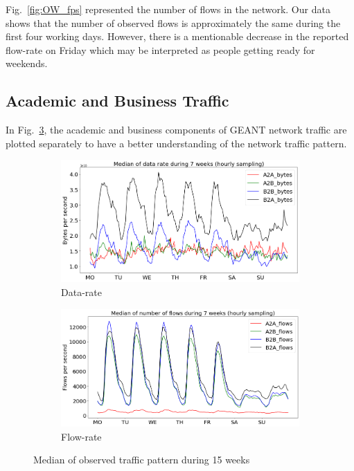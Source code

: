 \documentclass[10pt, journal, letterpaper]{IEEEtran}
\newcommand\figSzeMahdi{0.8}
\begin{document}
Fig.~\ref{fig:OW_fps} represented the number of flows in the network. Our data shows that the number of observed flows is approximately the same during the first four working days. However, there is a mentionable decrease in the reported flow-rate on Friday which may be interpreted as people getting ready for weekends.

\subsection{Academic and Business Traffic}
In Fig.~\ref{fig:OW_acaBus_bps_fps}, the academic and business components of GEANT network traffic are plotted separately to have a better understanding of the network traffic pattern.
\begin{figure}[!htb]
\centering
    \begin{subfigure}{\figSzeMahdi\columnwidth}
          \centering
          \includegraphics[width=\columnwidth]{img/BCH_acaBus_bps.png}
          \caption{Data-rate}
          \label{fig:OW_acaBus_bps}
    \end{subfigure}
    \begin{subfigure}{\figSzeMahdi\columnwidth}
          \centering
          \includegraphics[width=\columnwidth]{img/BCH_acaBus_fps.png}
          \caption{Flow-rate}
          \label{fig:OW_acaBus_fps}
    \end{subfigure}
    \caption{Median of observed traffic pattern during 15 weeks}
    \label{fig:OW_acaBus_bps_fps}
\end{figure}
\end{document}
